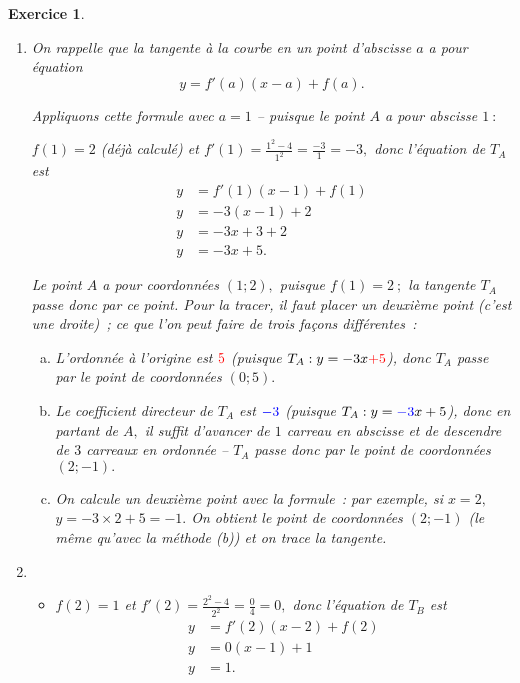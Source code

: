 \documentclass[10pt]{article}
\newtheorem{exo}{Exercice}
\begin{document}
\begin{exo}
\begin{enumerate}
\begin{multicols}{2}
On calcule les valeurs aux extrémités des flèches~:

\begin{itemize}
\item[\textbullet] $f(1)=1+\frac{4}{1}-3=2~;$
\item[\textbullet] $f(2)=2+\frac{4}{2}-3=1~;$
\item[\textbullet] $f(4)=4+\frac{4}{4}-3=2.$
\end{itemize}

\end{multicols}
\item On rappelle que la tangente à la courbe en un point d'abscisse $a$ a pour équation
\[y=f'(a)(x-a)+f(a).\]

Appliquons cette formule avec $a=1$ -- puisque le point $A$ a pour abscisse $1~:$

\medskip

$f(1)=2$ (déjà calculé) et $f'(1)=\frac{1^2-4}{1^2}=\frac{-3}{1}=-3,$ donc l'équation de $T_A$ est
\begin{align*}
y&=f'(1)(x-1)+f(1)\\
y&=-3(x-1)+2\\
y&=-3x+3+2\\
y&=-3x+5.
\end{align*}

Le point $A$ a pour coordonnées $(1;2),$ puisque $f(1)=2~;$ la tangente $T_A$ passe donc par ce point. Pour la tracer, il faut placer un deuxième point (c'est une droite)~; ce que l'on peut faire de trois façons différentes~:

\begin{enumerate}[(a)]
\item L'ordonnée à l'origine est $\textcolor{red}{5}$ (puisque $T_A:y=-3x\textcolor{red}{+5}$), donc $T_A$ passe par le point de coordonnées $(0;5).$
\item Le coefficient directeur de $T_A$ est $\textcolor{blue}{-3}$ (puisque $T_A:y=\textcolor{blue}{-3}x+5$), donc en partant de $A,$ il suffit d'avancer de $1$ carreau en abscisse et de descendre de $3$ carreaux en ordonnée -- $T_A$ passe donc par le point de coordonnées $(2;-1).$
\item On calcule un deuxième point avec la formule~: par exemple, si $x=2,$ $y=-3\times 2+5=-1.$ On obtient le point de coordonnées $(2;-1)$ (le même qu'avec la méthode (b)) et on trace la tangente.
\end{enumerate}

\item \begin{itemize}
\item[\textbullet] $f(2)=1$ et $f'(2)=\frac{2^2-4}{2^2}=\frac{0}{4}=0,$ donc l'équation de $T_B$ est
\begin{align*}
y&=f'(2)(x-2)+f(2)\\
y&=0(x-1)+1\\
y&=1.
\end{align*}


\end{itemize}
\end{enumerate}
\end{exo}
\end{document}
